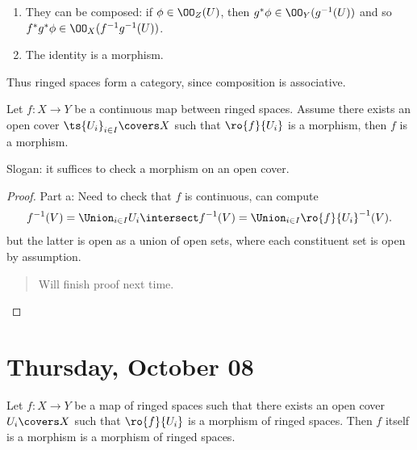 \begin{proposition}

\envlist

\begin{enumerate}
\def\labelenumi{\arabic{enumi}.}
\item
  They can be composed: if \(\phi \in \OO_Z(U)\), then
  \(g^* \phi \in \OO_Y(g^{-1}(U))\) and so
  \(f^* g^* \phi \in \OO_X(f^{-1} g^{-1} (U))\).
\item
  The identity is a morphism.
\end{enumerate}

Thus ringed spaces form a category, since composition is associative.

\end{proposition}

\begin{lemma}

Let \(f:X\to Y\) be a continuous map between ringed spaces. Assume there
exists an open cover \(\ts{U_i}_{i\in I}\covers X\) such that
\(\ro{f}{U_i}\) is a morphism, then \(f\) is a morphism.

Slogan: it suffices to check a morphism on an open cover.

\end{lemma}

\begin{proof}

Part a: Need to check that \(f\) is continuous, can compute
\begin{align*}  
f^{-1}(V) = \Union_{i\in I} U_i \intersect f^{-1}(V) = \Union_{i\in I} \ro{f}{U_i}^{-1} (V)
.\end{align*} but the latter is open as a union of open sets, where each
constituent set is open by assumption.

\begin{quote}
Will finish proof next time.
\end{quote}

\end{proof}

\hypertarget{thursday-october-08}{%
\section{Thursday, October 08}\label{thursday-october-08}}

\begin{proposition}[Gluing]

Let \(f:X\to Y\) be a map of ringed spaces such that there exists an
open cover \(U_i\covers X\) such that \(\ro{f}{U_i}\) is a morphism of
ringed spaces. Then \(f\) itself is a morphism is a morphism of ringed
spaces.

\end{proposition}

